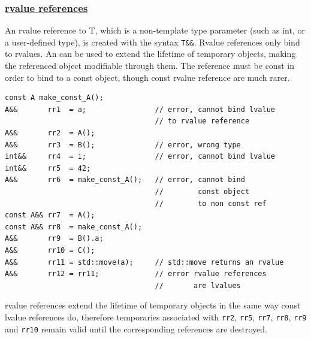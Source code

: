 \subsubsection{\href{https://github.com/AnthonyCalandra/modern-cpp-features/tree/master\#rvalue-references}
                    {rvalue references}}
An rvalue reference to T, which is a non-template type parameter 
(such as int, or a user-defined type), is created with the syntax \texttt{T\&\&}. 
Rvalue references only bind to rvalues.
An  can be used to extend the lifetime of 
temporary objects, making the referenced object modifiable through 
them. The reference must be const in order to bind to a const object, 
though const rvalue reference are much rarer.
\begin{lstlisting}[language=C+++]
const A make_const_A();
A&&       rr1  = a;                // error, cannot bind lvalue 
                                   // to rvalue reference
A&&       rr2  = A();
A&&       rr3  = B();              // error, wrong type
int&&     rr4  = i;                // error, cannot bind lvalue
int&&     rr5  = 42;
A&&       rr6  = make_const_A();   // error, cannot bind 
                                   //        const object 
                                   //        to non const ref
const A&& rr7  = A();
const A&& rr8  = make_const_A();
A&&       rr9  = B().a;
A&&       rr10 = C();
A&&       rr11 = std::move(a);     // std::move returns an rvalue
A&&       rr12 = rr11;             // error rvalue references 
                                   //       are lvalues
\end{lstlisting}
rvalue references extend the lifetime of temporary objects in the same 
way const lvalue references do, therefore temporaries associated with 
\texttt{rr2}, \texttt{rr5}, \texttt{rr7}, \texttt{rr8}, \texttt{rr9} 
and \texttt{rr10} remain valid until the corresponding references are 
destroyed. 

